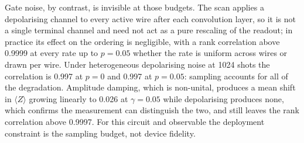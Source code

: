 Gate noise, by contrast, is invisible at those budgets. The scan applies a
depolarising channel to every active wire after each convolution layer, so it
is not a single terminal channel and need not act as a pure rescaling of the
readout; in practice its effect on the ordering is negligible, with a rank
correlation above \num{0.9999} at every rate up to $p = 0.05$
whether the rate is uniform across wires or drawn per wire. Under heterogeneous
depolarising noise at \num{1024} shots the correlation is \num{0.997} at
$p = 0$ and \num{0.997} at $p = 0.05$: sampling accounts for all of the
degradation. Amplitude damping, which is non-unital, produces a mean shift in
$\langle Z\rangle$ growing linearly to \num{0.026} at $\gamma = 0.05$ while
depolarising produces none, which confirms the measurement can distinguish the
two, and still leaves the rank correlation above \num{0.9997}. For this
circuit and observable the deployment constraint is the sampling budget, not
device fidelity.


